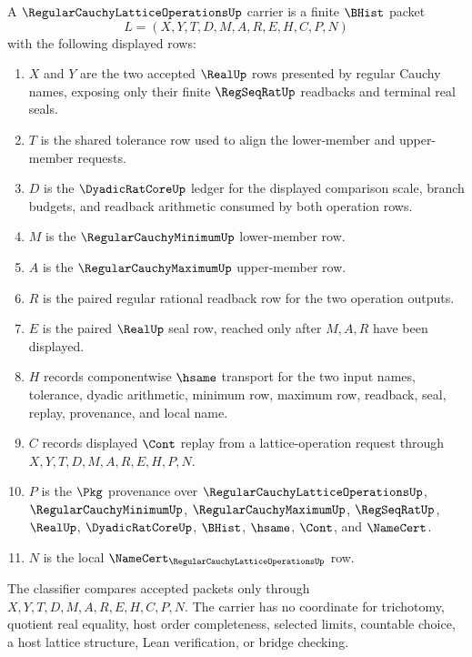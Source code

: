 \begin{definition}
\label{def:regular-cauchy-lattice-operations-carrier}
A $\RegularCauchyLatticeOperationsUp$ carrier is a finite $\BHist$ packet
$$
L=(X,Y,T,D,M,A,R,E,H,C,P,N)
$$
with the following displayed rows:
\begin{enumerate}
\item $X$ and $Y$ are the two accepted $\RealUp$ rows presented by regular Cauchy names, exposing only their finite $\RegSeqRatUp$ readbacks and terminal real seals.
\item $T$ is the shared tolerance row used to align the lower-member and upper-member requests.
\item $D$ is the $\DyadicRatCoreUp$ ledger for the displayed comparison scale, branch budgets, and readback arithmetic consumed by both operation rows.
\item $M$ is the $\RegularCauchyMinimumUp$ lower-member row.
\item $A$ is the $\RegularCauchyMaximumUp$ upper-member row.
\item $R$ is the paired regular rational readback row for the two operation outputs.
\item $E$ is the paired $\RealUp$ seal row, reached only after $M,A,R$ have been displayed.
\item $H$ records componentwise $\hsame$ transport for the two input names, tolerance, dyadic arithmetic, minimum row, maximum row, readback, seal, replay, provenance, and local name.
\item $C$ records displayed $\Cont$ replay from a lattice-operation request through $X,Y,T,D,M,A,R,E,H,P,N$.
\item $P$ is the $\Pkg$ provenance over $\RegularCauchyLatticeOperationsUp$, $\RegularCauchyMinimumUp$, $\RegularCauchyMaximumUp$, $\RegSeqRatUp$, $\RealUp$, $\DyadicRatCoreUp$, $\BHist$, $\hsame$, $\Cont$, and $\NameCert$.
\item $N$ is the local $\NameCert_{\RegularCauchyLatticeOperationsUp}$ row.
\end{enumerate}
The classifier compares accepted packets only through $X,Y,T,D,M,A,R,E,H,C,P,N$. The carrier has no coordinate for trichotomy, quotient real equality, host order completeness, selected limits, countable choice, a host lattice structure, Lean verification, or bridge checking.
\end{definition}

